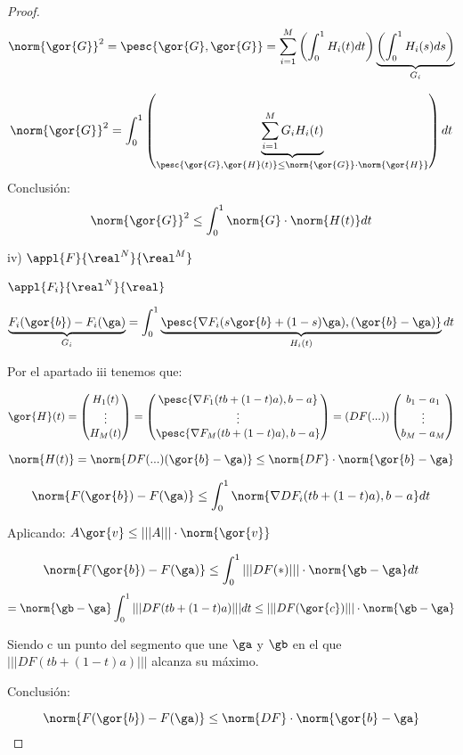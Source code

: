 \documentclass{apuntes}
\begin{document}
\begin{itemize}
\begin{proof}
   
   $$\norm{\gor{G}}^2 = \pesc{\gor{G},\gor{G}} = \sum_{i=1}^M \left(\int_0^1 H_i(t)dt\right) \underbrace{\left(\int_0^1 H_i(s)ds\right)}_{G_i}$$
 
   $$\norm{\gor{G}}^2 = \displaystyle\int_0^1 \left(\underbrace{\sum_{i=1}^M G_i H_i (t)}_{\pesc{\gor{G},\gor{H}(t)}\leq \norm{\gor{G}}\cdot \norm{\gor{H}}}\right)dt$$
   Conclusión:
   $$\norm{\gor{G}}^2 \leq \displaystyle\int_0^1\norm{G}\cdot\norm{H(t)}dt$$
   
   iv) $\appl{F}{\real^N}{\real^M}$
   
   $\appl{F_i}{\real^N}{\real}$
   
   $\underbrace{F_i(\gor{b})-F_i(\ga)}_{G_i} = \displaystyle\int_0^1 \underbrace{\pesc{\nabla F_i (s\gor{b}+(1-s)\ga ),(\gor{b}-\ga)}}_{H_i(t)}dt$
   
   Por el apartado iii tenemos que:
   
   
   $$\gor{H}(t) = \begin{pmatrix}
                   H_1(t)\\
                   \vdots\\
                   H_M(t)
                  \end{pmatrix}
                = \begin{pmatrix}
                   \pesc{\nabla F_1(tb+(1-t)a),b-a}\\
                   \vdots\\
                   \pesc{\nabla F_M(tb+(1-t)a),b-a}
                  \end{pmatrix}
		= \left(DF(...)\right)\begin{pmatrix}
		                        b_1-a_1\\
		                        \vdots\\
		                        b_M-a_M
		                       \end{pmatrix}
$$

$$\norm{H(t)} = \norm{DF(...)(\gor{b}-\ga)} \leq \norm{DF}\cdot\norm{\gor{b}-\ga}$$


$$\norm{F(\gor{b})-F(\ga)} \leq \displaystyle\int_0^1 \norm{\nabla DF_i(tb+(1-t)a),b-a}dt$$

Aplicando: $A\gor{v} \leq |||A|||\cdot \norm{\gor{v}}$

$$\norm{F(\gor{b})-F(\ga)} \leq \displaystyle\int_0^1 |||DF(*)|||\cdot\norm{\gb-\ga}dt$$
$$= \norm{\gb - \ga} \displaystyle \int_0^1 |||DF(tb+(1-t)a)||| dt \leq |||DF(\gor{c})|||\cdot\norm{\gb-\ga}$$ 

Siendo c un punto del segmento que une $\ga$ y $\gb$ en el que $|||DF(tb+(1-t)a)|||$ alcanza su máximo.
   
Conclusión:

$$\norm{F(\gor{b})-F(\ga)} \leq \norm{DF}\cdot\norm{\gor{b}-\ga}$$
  \end{proof}

\end{itemize}
\end{document}
